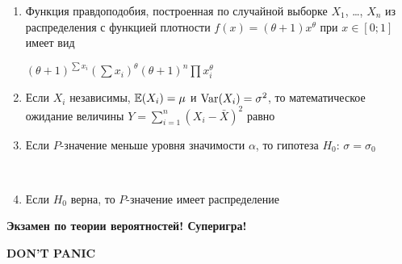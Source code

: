 \documentclass[12pt, a4paper]{article}\usepackage[]{graphicx}\usepackage[]{color}
\begin{document}
\begin{enumerate}
					\item Функция правдоподобия, построенная по случайной выборке $X_1$, \ldots, $X_n$ из распределения с функцией плотности $f(x)=(\theta+1)x^{\theta}$ при $x\in [0;1]$ имеет вид

					{$(\theta+1)^{\sum x_i}$}{$(\sum x_i)^{\theta}$}{$(\theta+1)^n\prod x_i^{\theta}$}

					\item Если $X_i$ независимы, $\mathbb{E}(X_i)=\mu$ и $\operatorname{Var}(X_i)=\sigma^2$, то математическое ожидание величины $Y=\sum_{i=1}^{n}(X_i-\bar{X})^2$ равно


					\item Если $P$-значение меньше уровня значимости $\alpha$, то гипотеза $H_0$: $\sigma=\sigma_0$

					 \\

					\item Если $H_0$ верна, то $P$-значение имеет распределение



				\end{enumerate}




				\textbf{Экзамен по теории вероятностей! Суперигра!}

				\vspace{20pt}
				\begin{center}
					\textbf{DON'T PANIC}
				\end{center}
				\vspace{20pt}
\end{document}
